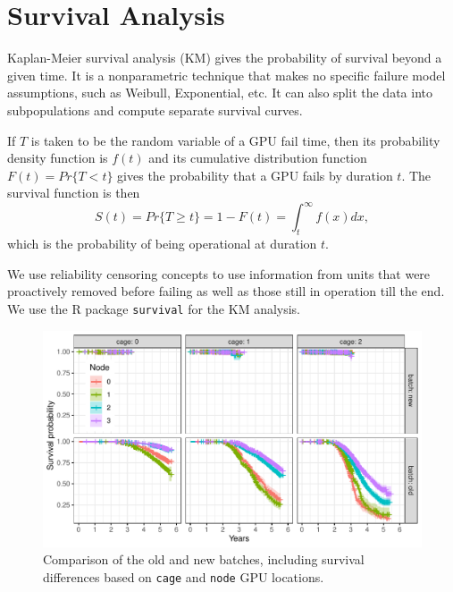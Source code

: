 \section{Survival Analysis}
\label{section:survival}

 Kaplan-Meier survival analysis (KM) gives the probability of survival
beyond a given time. It is a nonparametric technique that makes no
specific failure model assumptions, such as Weibull, Exponential,
etc. It can also split the data into subpopulations and compute
separate survival curves. 

If $T$ is taken to be the random variable of a GPU fail time, then its
probability density function is $f(t)$ and its cumulative distribution
function $F(t) = Pr\{T < t\}$ gives the probability that a GPU fails
by duration $t$. The survival function is then 
\begin{displaymath}
  S(t) = Pr\{T \geq t\} = 1 - F(t) = \int_t^\infty f(x)dx,
\end{displaymath}
which is the probability of being operational at duration
$t$.

We use reliability censoring concepts to use information from units
that were proactively removed before failing as well as those still in
operation till the end. We use the R package {\tt survival} for the KM
analysis.
\begin{figure}
  \centering
  \includegraphics[width=7in]{figs/km_cage-node_a001.pdf}
  \caption{Comparison of the old and new batches, including survival
    differences based on {\tt cage} and {\tt node} GPU locations.}
  \label{fig:km-all-cage-node}
\end{figure}


